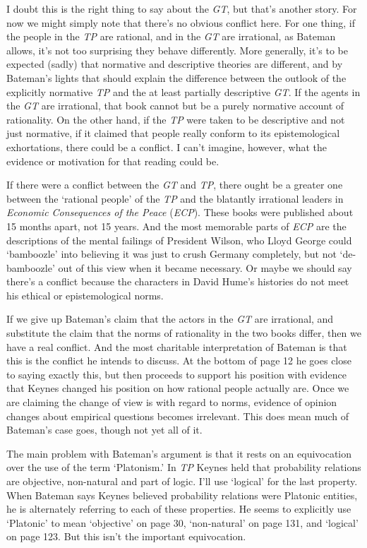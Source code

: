 \documentclass[noflushend]{philosophersimprint}
\begin{document}
I doubt this is the right thing to say about the \emph{GT}, but that's
another story. For now we might simply note that there's no obvious
conflict here. For one thing, if the people in the \emph{TP} are
rational, and in the \emph{GT} are irrational, as Bateman allows, it's
not too surprising they behave differently. More generally, it's to be
expected (sadly) that normative and descriptive theories are different,
and by Bateman's lights that should explain the difference between the
outlook of the explicitly normative \emph{TP} and the at least partially
descriptive \emph{GT}. If the agents in the \emph{GT} are irrational,
that book cannot but be a purely normative account of rationality. On
the other hand, if the \emph{TP} were taken to be descriptive and not
just normative, if it claimed that people really conform to its
epistemological exhortations, there could be a conflict. I can't
imagine, however, what the evidence or motivation for that reading could
be.

If there were a conflict between the \emph{GT} and \emph{TP}, there
ought be a greater one between the `rational people' of the \emph{TP}
and the blatantly irrational leaders in \emph{Economic Consequences of
the Peace} (\emph{ECP}). These books were published about 15 months
apart, not 15 years. And the most memorable parts of \emph{ECP} are the
descriptions of the mental failings of President Wilson, who Lloyd
George could `bamboozle' into believing it was just to crush Germany
completely, but not `de-bamboozle' out of this view when it became
necessary. Or maybe we should say there's a conflict because the
characters in David Hume's histories do not meet his ethical or
epistemological norms.

If we give up Bateman's claim that the actors in the \emph{GT} are
irrational, and substitute the claim that the norms of rationality in
the two books differ, then we have a real conflict. And the most
charitable interpretation of Bateman is that this is the conflict he
intends to discuss. At the bottom of page 12 he goes close to saying
exactly this, but then proceeds to support his position with evidence
that Keynes changed his position on how rational people actually are.
Once we are claiming the change of view is with regard to norms,
evidence of opinion changes about empirical questions becomes
irrelevant. This does mean much of Bateman's case goes, though not yet
all of it.

The main problem with Bateman's argument is that it rests on an
equivocation over the use of the term `Platonism.' In \emph{TP} Keynes
held that probability relations are objective, non-natural and part of
logic. I'll use `logical' for the last property. When Bateman says
Keynes believed probability relations were Platonic entities, he is
alternately referring to each of these properties. He seems to
explicitly use `Platonic' to mean `objective' on page 30, `non-natural'
on page 131, and `logical' on page 123. But this isn't the important
equivocation.
\end{document}
